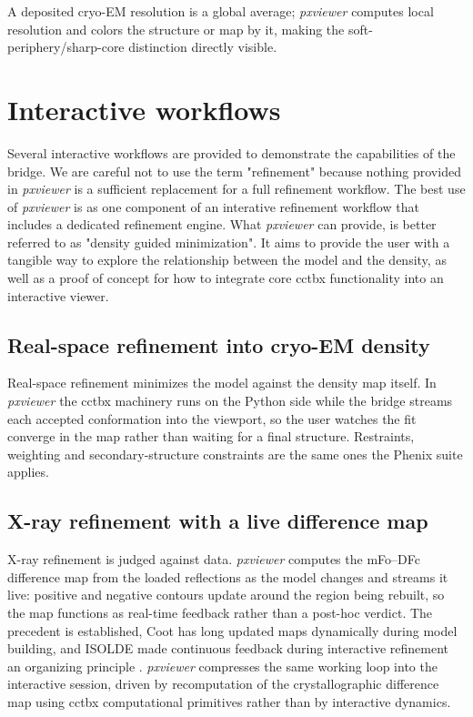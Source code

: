 \documentclass[11pt]{article}
\newcommand{\pxviewer}{\emph{pxviewer}}
\begin{document}
A deposited cryo-EM resolution is a global average; \pxviewer{} computes
local resolution and colors the structure or map by it, making the
soft-periphery/sharp-core distinction directly visible.

\section{Interactive workflows}

Several interactive workflows are provided to demonstrate the capabilities of the bridge. 
We are careful not to use the term "refinement" because nothing provided in \pxviewer{} is
a sufficient replacement for a full refinement workflow. The best use of \pxviewer{} is as one
component of an interative refinement workflow that includes a dedicated refinement engine. What
\pxviewer{} can provide, is better referred to as "density guided minimization". It aims to provide
the user with a tangible way to explore the relationship between the model and the density, as well as
a proof of concept for how to integrate core cctbx functionality into an interactive viewer.

\subsection{Real-space refinement into cryo-EM density}

Real-space refinement \citep{rsr2018} minimizes the model against the
density map itself. In \pxviewer{} the cctbx machinery runs on the Python
side while the bridge streams each accepted conformation into the viewport,
so the user watches the fit converge in the map rather than waiting for a
final structure. Restraints, weighting and secondary-structure constraints
are the same ones the Phenix suite applies.

\subsection{X-ray refinement with a live difference map}

X-ray refinement is judged against data. \pxviewer{} computes the
mFo--DFc difference map from the loaded reflections as the model changes and
streams it live: positive and negative contours update around the region
being rebuilt, so the map functions as real-time feedback rather than a
post-hoc verdict. The precedent is established, Coot has long updated
maps dynamically during model building, and ISOLDE made continuous feedback
during interactive refinement an organizing principle
\citep{coot2004,coot2010,isolde2018}. \pxviewer{} compresses the same
working loop into the interactive session, driven by recomputation of the
crystallographic difference map using cctbx computational primitives rather than by interactive
dynamics.
\end{document}
